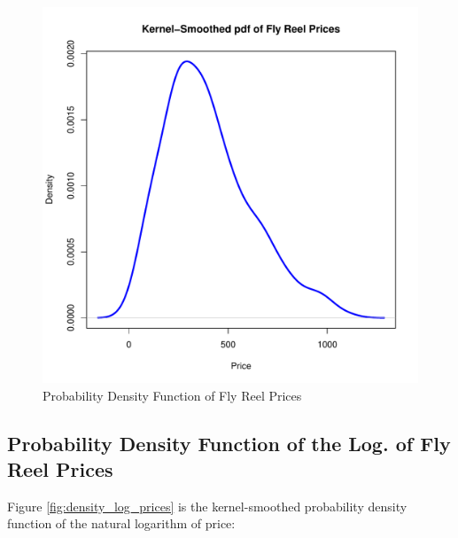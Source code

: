 \begin{figure}[h!]
  \centering
  \includegraphics[scale = 0.5, keepaspectratio=true]{../Figures/density_prices}
  \caption{Probability Density Function of Fly Reel Prices} \label{fig:density_prices}
\end{figure}


\subsection{Probability Density Function of the Log. of Fly Reel Prices}

Figure \ref{fig:density_log_prices} is the kernel-smoothed probability density function of the natural logarithm of
price:

